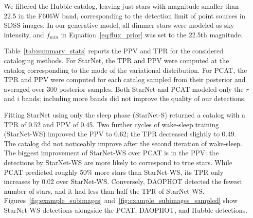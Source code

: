 We filtered the Hubble catalog, leaving just stars with magnitude smaller than 22.5 in the F606W band, corresponding to the detection limit of point sources in SDSS images. 
In our generative model, all dimmer stars were modeled as sky intensity, and $f_{min}$ in Equation~\eqref{eq:flux_prior} was set to the 22.5th magnitude. 

Table~\ref{tab:summary_stats} reports the PPV and TPR for the considered cataloging methods.
For StarNet, the TPR and PPV were computed at the catalog corresponding to the mode of the variational distribution. 
For PCAT, the TPR and PPV were computed for each catalog sampled from their posterior and averaged over 300 posterior samples. 
Both StarNet and PCAT modeled only the $r$ and $i$ bands;
including more bands did not improve the quality of our detections. 

Fitting StarNet using only the sleep phase (StarNet-S) returned 
a catalog with a TPR of 0.52 and PPV of 0.45. Two further cycles of wake-sleep training (StarNet-WS) improved the PPV to 0.62; the TPR decreased slightly to 0.49.
The catalog did not noticeably improve after the second iteration of wake-sleep. 
The biggest improvement of StarNet-WS over PCAT is in the PPV: 
the detections by StarNet-WS are more likely to correspond to 
true stars. 
While PCAT predicted roughly 50\% more stars than StarNet-WS, 
its TPR only increases by 0.02 over StarNet-WS. 
Conversely, DAOPHOT detected the fewest number of stars, and it had less than half the TPR of StarNet-WS.
Figures~\ref{fig:example_subimages} and~\ref{fig:example_subimages_sampled} show StarNet-WS detections alongside the PCAT, DAOPHOT, and Hubble detections. 



